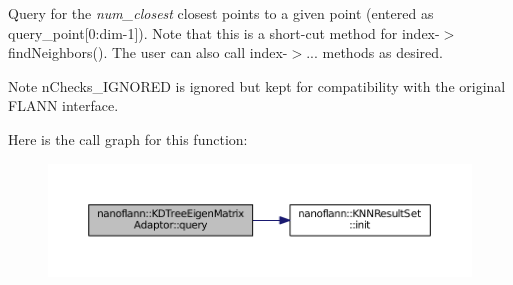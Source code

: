 Query for the {\itshape num\-\_\-closest} closest points to a given point (entered as query\-\_\-point\mbox{[}0\-:dim-\/1\mbox{]}). Note that this is a short-\/cut method for index-\/$>$find\-Neighbors(). The user can also call index-\/$>$... methods as desired. \begin{DoxyNote}{Note}
n\-Checks\-\_\-\-I\-G\-N\-O\-R\-E\-D is ignored but kept for compatibility with the original F\-L\-A\-N\-N interface. 
\end{DoxyNote}


Here is the call graph for this function\-:\nopagebreak
\begin{figure}[H]
\begin{center}
\leavevmode
\includegraphics[width=350pt]{structnanoflann_1_1_k_d_tree_eigen_matrix_adaptor_a65ad5a444a16a474351e39b7775accaa_cgraph}
\end{center}
\end{figure}




